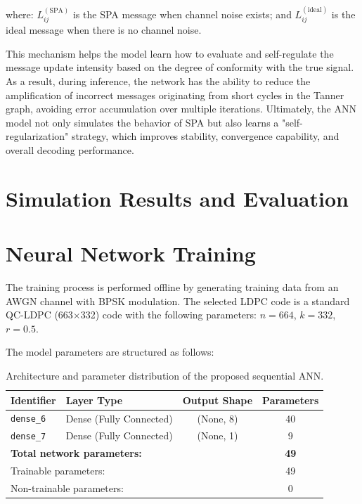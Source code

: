 \documentclass[a4paper,14pt]{extreport}
\begin{document}
where: $L_{ij}^{(\text{SPA})}$ is the SPA message when channel noise exists; and $L_{ij}^{(\text{ideal})}$ is the ideal message when there is no channel noise.

This mechanism helps the model learn how to evaluate and self-regulate the message update intensity based on the degree of conformity with the true signal. As a result, during inference, the network has the ability to reduce the amplification of incorrect messages originating from short cycles in the Tanner graph, avoiding error accumulation over multiple iterations. Ultimately, the ANN model not only simulates the behavior of SPA but also learns a "self-regularization" strategy, which improves stability, convergence capability, and overall decoding performance.


\section{Simulation Results and Evaluation}

\section{Neural Network Training}

The training process is performed offline by generating training data from an AWGN channel with BPSK modulation. The selected LDPC code is a standard QC-LDPC (663$\times$332) code with the following parameters: $n = 664$, $k = 332$, $r = 0.5$.

The model parameters are structured as follows:

\begin{table}[H]
    \centering
    \caption{Architecture and parameter distribution of the proposed sequential ANN.}
    \vspace{0.2cm}
    \begin{tabular}{llcc}
        \toprule
        \textbf{Identifier} & \textbf{Layer Type} & \textbf{Output Shape} & \textbf{Parameters} \\
        \midrule
        \texttt{dense\_6} & Dense (Fully Connected) & (None, 8) & 40 \\
        \texttt{dense\_7} & Dense (Fully Connected) & (None, 1) & 9 \\
        \midrule
        \multicolumn{3}{l}{\textbf{Total network parameters:}} & \textbf{49} \\
        \multicolumn{3}{l}{Trainable parameters:} & 49 \\
        \multicolumn{3}{l}{Non-trainable parameters:} & 0 \\
        \bottomrule
    \end{tabular}
    \label{tab:ann_model_summary}
\end{table}
\end{document}
